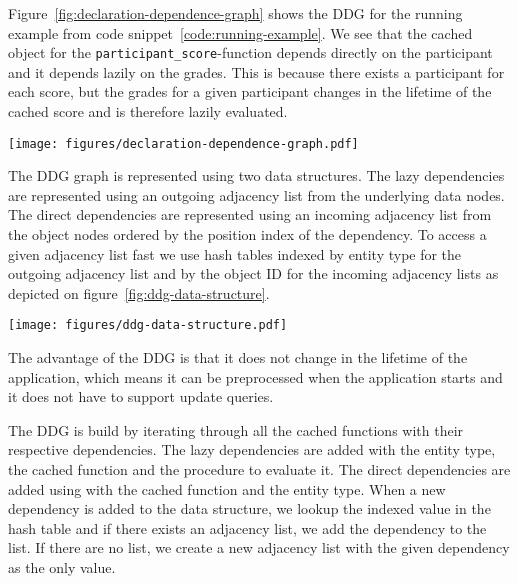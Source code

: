 Figure~\ref{fig:declaration-dependence-graph} shows the DDG for the running example from code snippet~\ref{code:running-example}. We see that the cached object for the \verb$participant_score$-function depends directly on the participant and it depends lazily on the grades. This is because there exists a participant for each score, but the grades for a given participant changes in the lifetime of the cached score and is therefore lazily evaluated.

\begin{figure*}[ht!]
  \centering
  \texttt{[image: figures/declaration-dependence-graph.pdf]}
  \caption{The Declaration Dependence Graph of the running example}
  \label{fig:declaration-dependence-graph}
\end{figure*}

The DDG graph is represented using two data structures. The lazy dependencies are represented using an outgoing adjacency list from the underlying data nodes. The direct dependencies are represented using an incoming adjacency list from the object nodes ordered by the position index of the dependency. To access a given adjacency list fast we use hash tables indexed by entity type for the outgoing adjacency list and by the object ID for the incoming adjacency lists as depicted on figure~\ref{fig:ddg-data-structure}.

\begin{figure*}[ht!]
  \centering
  \texttt{[image: figures/ddg-data-structure.pdf]}
  \caption{An illustration of the data structure representing the DDG on figure~\ref{fig:declaration-dependence-graph}}
  \label{fig:ddg-data-structure}
\end{figure*}

The advantage of the DDG is that it does not change in the lifetime of the application, which means it can be preprocessed when the application starts and it does not have to support update queries.

The DDG is build by iterating through all the cached functions with their respective dependencies. The lazy dependencies are added with the entity type, the cached function and the procedure to evaluate it. The direct dependencies are added using with the cached function and the entity type. When a new dependency is added to the data structure, we lookup the indexed value in the hash table and if there exists an adjacency list, we add the dependency to the list. If there are no list, we create a new adjacency list with the given dependency as the only value.

